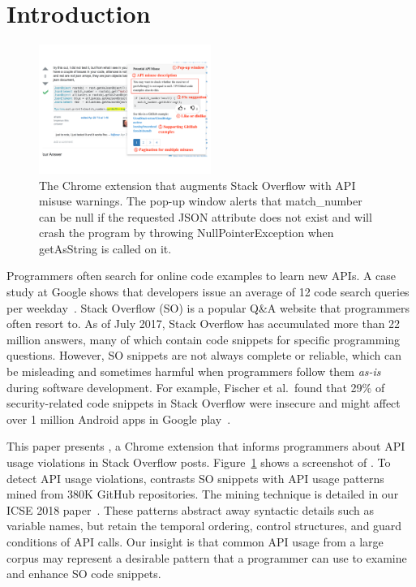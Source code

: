 \section{Introduction}
\label{sec:intro}

\begin{figure}
\centering
\includegraphics[width=0.5\textwidth]{examplecheck-screenshot.pdf}
  \caption{The {\tool} Chrome extension that augments Stack Overflow with API misuse warnings. The pop-up window alerts that {\ttt match\_number} can be {\ttt null} if the requested {\ttt JSON} attribute does not exist and will crash the program by throwing {\ttt NullPointerException} when {\ttt getAsString} is called on it.}
  \label{fig:screenshot}
  \vspace{-0.1in}
\end{figure}

Programmers often search for online code examples to learn new APIs. A case study at Google shows that developers issue an average of 12 code search queries per weekday~\cite{sadowski2015developers}. Stack Overflow (SO) is a popular Q\&A website that programmers often resort to. As of July 2017, Stack Overflow has accumulated more than 22 million answers, many of which contain code snippets for specific programming questions. However, SO snippets are not always complete or reliable, which can be misleading and sometimes harmful when programmers follow them {\em as-is} during software development. For example, Fischer et al.~found that 29\% of security-related code snippets in Stack Overflow were insecure and might affect over 1 million Android apps in Google play~\cite{fischer2017stack}. 

This paper presents {\tool}, a Chrome extension that informs programmers about API usage violations in Stack Overflow posts. Figure~\ref{fig:screenshot} shows a screenshot of {\tool}. To detect API usage violations, {\tool} contrasts SO snippets with API usage patterns mined from 380K GitHub repositories. The mining technique is detailed in our ICSE 2018 paper~\cite{zhang2018code}. These patterns abstract away syntactic details such as variable names, but retain the temporal ordering, control structures, and guard conditions of API calls. Our insight is that common API usage from a large corpus may represent a desirable pattern that a programmer can use to examine and enhance SO code snippets. 

